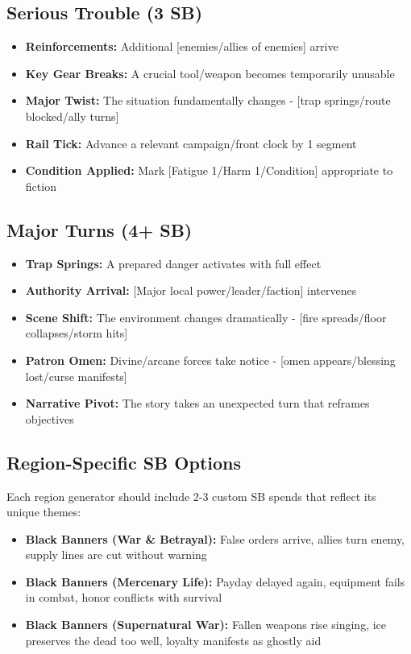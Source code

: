 \subsection*{Serious Trouble (3 SB)}
\begin{itemize}
\item \textbf{Reinforcements:} Additional [enemies/allies of enemies] arrive
\item \textbf{Key Gear Breaks:} A crucial tool/weapon becomes temporarily unusable
\item \textbf{Major Twist:} The situation fundamentally changes - [trap springs/route blocked/ally turns]
\item \textbf{Rail Tick:} Advance a relevant campaign/front clock by 1 segment
\item \textbf{Condition Applied:} Mark [Fatigue 1/Harm 1/Condition] appropriate to fiction
\end{itemize}

\subsection*{Major Turns (4+ SB)}
\begin{itemize}
\item \textbf{Trap Springs:} A prepared danger activates with full effect
\item \textbf{Authority Arrival:} [Major local power/leader/faction] intervenes
\item \textbf{Scene Shift:} The environment changes dramatically - [fire spreads/floor collapses/storm hits]
\item \textbf{Patron Omen:} Divine/arcane forces take notice - [omen appears/blessing lost/curse manifests]
\item \textbf{Narrative Pivot:} The story takes an unexpected turn that reframes objectives
\end{itemize}

\subsection*{Region-Specific SB Options}
Each region generator should include 2-3 custom SB spends that reflect its unique themes:

\begin{itemize}
\item \textbf{Black Banners (War \& Betrayal):} False orders arrive, allies turn enemy, supply lines are cut without warning
\item \textbf{Black Banners (Mercenary Life):} Payday delayed again, equipment fails in combat, honor conflicts with survival
\item \textbf{Black Banners (Supernatural War):} Fallen weapons rise singing, ice preserves the dead too well, loyalty manifests as ghostly aid
\end{itemize}


